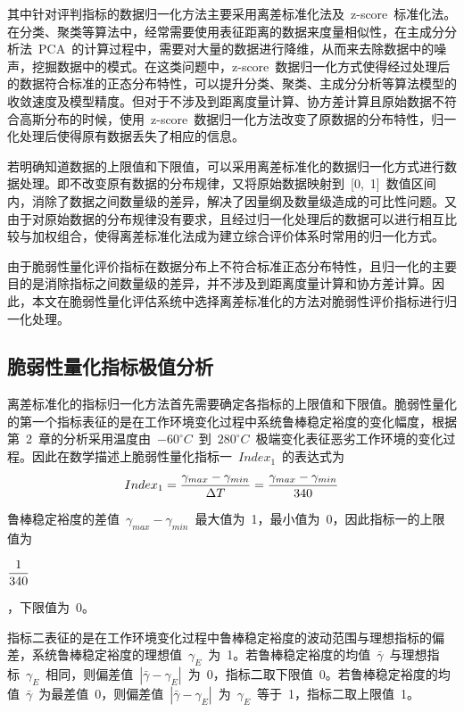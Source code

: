 \medskip

其中针对评判指标的数据归一化方法主要采用离差标准化法及~z-score~标准化法。在分类、聚类等算法中，经常需要使用表征距离的数据来度量相似性，在主成分分析法~PCA~的计算过程中，需要对大量的数据进行降维，从而来去除数据中的噪声，挖掘数据中的模式。在这类问题中，z-score~数据归一化方式使得经过处理后的数据符合标准的正态分布特性，可以提升分类、聚类、主成分分析等算法模型的收敛速度及模型精度。但对于不涉及到距离度量计算、协方差计算且原始数据不符合高斯分布的时候，使用~z-score~数据归一化方法改变了原数据的分布特性，归一化处理后使得原有数据丢失了相应的信息。

若明确知道数据的上限值和下限值，可以采用离差标准化的数据归一化方式进行数据处理。即不改变原有数据的分布规律，又将原始数据映射到~[0,~1]~数值区间内，消除了数据之间数量级的差异，解决了因量纲及数量级造成的可比性问题。又由于对原始数据的分布规律没有要求，且经过归一化处理后的数据可以进行相互比较与加权组合，使得离差标准化法成为建立综合评价体系时常用的归一化方式。

由于脆弱性量化评价指标在数据分布上不符合标准正态分布特性，且归一化的主要目的是消除指标之间数量级的差异，并不涉及到距离度量计算和协方差计算。因此，本文在脆弱性量化评估系统中选择离差标准化的方法对脆弱性评价指标进行归一化处理。
\subsection{脆弱性量化指标极值分析}
离差标准化的指标归一化方法首先需要确定各指标的上限值和下限值。脆弱性量化的第一个指标表征的是在工作环境变化过程中系统鲁棒稳定裕度的变化幅度，根据第~2~章的分析采用温度由~$-60^ {\circ}C$~到~$280^ {\circ}C$~极端变化表征恶劣工作环境的变化过程。因此在数学描述上脆弱性量化指标一~$Index_1$~的表达式为
\begin{equation}\label{equ:chap4:Index6}
 Index_1=\displaystyle\frac{\gamma_{max}-\gamma_{min}}{\Delta T}=\displaystyle\frac{\gamma_{max}-\gamma_{min}}{340}
\end{equation}

鲁棒稳定裕度的差值~$\gamma_{max}-\gamma_{min}$~最大值为~1，最小值为~0，因此指标一的上限值为~\begin{footnotesize}$\displaystyle\frac{1}{340} $\end{footnotesize}，下限值为~0。

指标二表征的是在工作环境变化过程中鲁棒稳定裕度的波动范围与理想指标的偏差，系统鲁棒稳定裕度的理想值~$\gamma_{E}$~为~1。若鲁棒稳定裕度的均值~$\bar{\gamma}$~与理想指标~$\gamma_{E}$~相同，则偏差值~$\left\vert\bar{\gamma}-\gamma_{E}\right\vert$~为~0，指标二取下限值~0。若鲁棒稳定裕度的均值~$\bar{\gamma}$~为最差值~0，则偏差值~$\left\vert\bar{\gamma}-\gamma_{E}\right\vert$~为~$\gamma_E$~等于~1，指标二取上限值~1。

